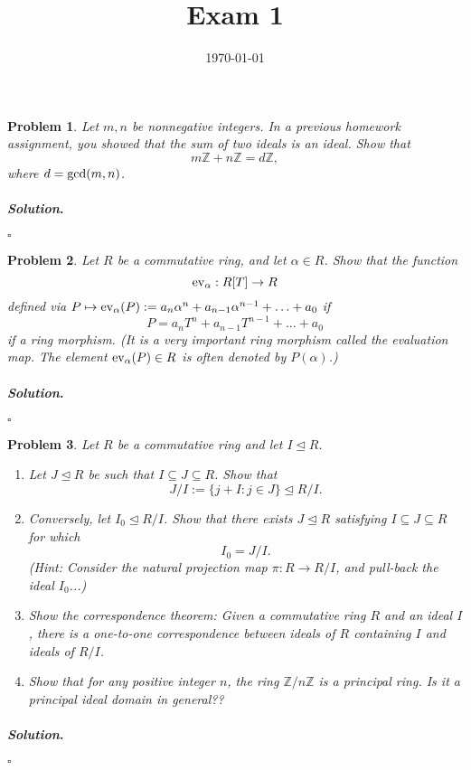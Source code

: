 \documentclass[reqno]{amsart}
\theoremstyle{plain}
\newtheorem{problem}{Problem}
\theoremstyle{definition}
\newenvironment{solution}{\paragraph{\emph{Solution}.}}{\hfill$\square$}
\begin{document}
 

\title[Exam 1]{Exam 1}

\date{\today} 
\maketitle 




\begin{problem}
Let $m,n$ be nonnegative integers.  In a previous homework assignment, you showed that the sum of two ideals is an ideal.  Show that
$$m\mathbb{Z} + n\mathbb{Z} = d\mathbb{Z}, $$
where $d = {\rm gcd}(m,n)$.
\end{problem}
\begin{solution}

\end{solution}



\begin{problem}
Let $R$ be a commutative ring, and let $\alpha \in R$.  Show that the function
$${\rm ev}_{\alpha}:R[T] \rightarrow R $$
defined via $P \mapsto {\rm ev}_{\alpha}(P):= a_{n}\alpha^{n} + a_{n-1}\alpha^{n-1} + \ldots + a_{0}$ if 
$$P = a_{n}T^{n} + a_{n-1}T^{n-1} + \ldots + a_{0}$$ 
if a ring morphism.  (It is a very important ring morphism called the evaluation map.  The element ${\rm ev}_{\alpha}(P) \in R$ is often denoted by $P(\alpha)$.)
\end{problem}
\begin{solution}

\end{solution}



\begin{problem}
Let $R$ be a commutative ring and let $I \unlhd R$.
\begin{enumerate}
\item Let $J \unlhd R$ be such that $I \subseteq J \subseteq R$.  Show that
$$J/I :=\{j + I : j \in J\} \unlhd R/I. $$
\item Conversely, let $I_{0} \unlhd R/I$.  Show that there exists $J \unlhd R$ satisfying $I \subseteq J \subseteq R$ for which
$$I_{0} = J/I. $$
(Hint:  Consider the natural projection map $\pi:R \rightarrow R/I$, and pull-back the ideal $I_{0}$...)
\item Show the correspondence theorem:  Given a commutative ring $R$ and an ideal $I$, there is a one-to-one correspondence between ideals of $R$ containing $I$ and ideals of $R/I$.
\item Show that for any positive integer $n$, the ring $\mathbb{Z}/n\mathbb{Z}$ is a principal ring.  Is it a principal ideal domain in general??
\end{enumerate}
\end{problem}
\begin{solution}

\end{solution}
\end{document}
